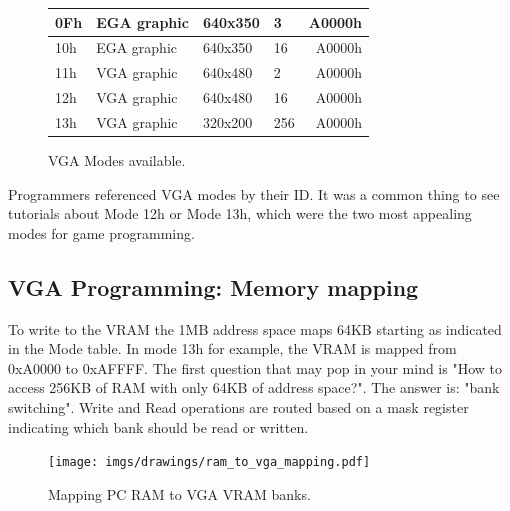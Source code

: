 \documentclass[book.tex]{subfiles}
\begin{document}
\begin{figure}[H]
\begin{table}[H]
\begin{tabularx}{\textwidth}[c]{llllr}
0Fh           & EGA graphic   & 640x350         & 3                        & A0000h                                \\ \hline
10h           & EGA graphic   & 640x350         & 16                       & A0000h                                \\ \hline
11h           & VGA graphic   & 640x480         & 2                        & A0000h                                \\ \hline
12h           & VGA graphic   & 640x480         & 16                       & A0000h                                \\ \hline
13h           & VGA graphic   & 320x200         & 256                      & A0000h                                \\ \hline
\end{tabularx}
\end{table}
\caption{VGA Modes available.}\label{fig:vga_modes}
 \end{figure}
 
 Programmers referenced VGA modes by their ID. It was a common thing to see tutorials about Mode 12h or Mode 13h, which were the two most appealing modes for game programming.


 \subsection{VGA Programming: Memory mapping}
To write to the VRAM the 1MB address space maps 64KB starting as indicated in the Mode table. In mode 13h for example, the VRAM is mapped from 0xA0000 to 0xAFFFF. The first question that may pop in your mind is "How to access 256KB of RAM with only 64KB of address space?". The answer is: "bank switching". Write and Read operations are routed based on a mask register indicating which bank should be read or written.\\
\par
 \begin{figure}[H]
\centering
  
      \texttt{[image: imgs/drawings/ram\_to\_vga\_mapping.pdf]}
    
\caption{Mapping PC RAM to VGA VRAM banks.}
\end{figure}



 
\end{document}
